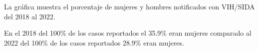 La gráfica muestra el porcentaje de mujeres y hombres notificados con VIH/SIDA del 2018 al 2022. 

En el 2018 del 100\% de los casos reportados el 35.9\% eran mujeres comparado al 2022 del 100\% de los casos reportados 28.9\% eran mujeres. 